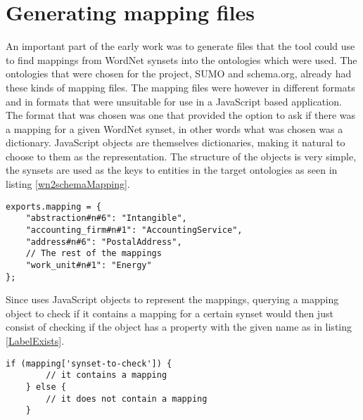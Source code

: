 \section{Generating mapping files}
An important part of the early work was to generate files that the tool could use to find mappings from WordNet synsets
into the ontologies which were used.
The ontologies that were chosen for the project, SUMO  and schema.org, already had these kinds of mapping files.
The mapping files were however in different formats and in formats that were unsuitable for use in a JavaScript based application.
The format that was chosen was one that provided the option to ask if there was a mapping for a given WordNet synset,
in other words what was chosen was a dictionary.
JavaScript objects are themselves dictionaries, making it natural to choose to them as the representation.
The structure of the objects is very simple,
the synsets are used as the keys to entities in the target ontologies as seen in listing \ref{wn2schemaMapping}.

\begin{lstlisting}[label=wn2schemaMapping, caption={Excerpt from the WordNet to schema.org (\href{https://github.com/EivindEE/Madame/blob/master/mappings/wn2schema.js}{wn2schema.js}) mapping file}]
exports.mapping = {
	"abstraction#n#6": "Intangible",
	"accounting_firm#n#1": "AccountingService",
	"address#n#6": "PostalAddress",
	// The rest of the mappings
	"work_unit#n#1": "Energy"
};
\end{lstlisting}

Since \theartefact uses JavaScript objects to represent the mappings,
querying a mapping object to check if it contains a mapping for a certain synset would then just consist of checking if
the object has a property with the given name as in listing \ref{LabelExists}.
\begin{lstlisting}[label=LabelExists,caption=Testing if a mapping exists]
	if (mapping['synset-to-check']) {
		// it contains a mapping
	} else {
		// it does not contain a mapping
	}
\end{lstlisting}

